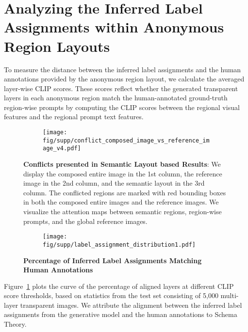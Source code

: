 \vspace{1mm}
\section{Analyzing the Inferred Label Assignments within Anonymous Region Layouts}
To measure the distance between the inferred label assignments and the human annotations provided by the anonymous region layout, we calculate the averaged layer-wise CLIP scores. These scores reflect whether the generated transparent layers in each anonymous region match the human-annotated ground-truth region-wise prompts by computing the CLIP scores between the regional visual features and the regional prompt text features.

\begin{figure}[!t]
\begin{minipage}[!t]{1\linewidth}
\begin{subfigure}[b]{1\textwidth}
\centering
\texttt{[image: fig/supp/conflict\_composed\_image\_vs\_reference\_image\_v4.pdf]}
\vspace{-3mm}
\end{subfigure}
\vspace{-5mm}
\caption{\footnotesize{
\textbf{Conflicts presented in Semantic Layout based Results}:
We display the composed entire image in the 1st column, the reference image in the 2nd column, and the semantic layout in the 3rd column. The conflicted regions are marked with red bounding boxes in both the composed entire images and the reference images. We visualize the attention maps between semantic regions, region-wise prompts, and the global reference images.
}}
\label{fig:conflict_case}
\end{minipage}
\vspace{3mm}
\begin{minipage}[!t]{1\linewidth}
\begin{subfigure}[b]{1\textwidth}
\centering
\texttt{[image: fig/supp/label\_assignment\_distribution1.pdf]}
\vspace{-3mm}
\end{subfigure}
\caption{\footnotesize{
\textbf{Percentage of Inferred Label Assignments Matching Human Annotations}
}}
\label{fig:percentage_threshold}
\end{minipage}
\end{figure}

Figure~\ref{fig:percentage_threshold} plots the curve of the percentage of aligned layers at different CLIP score thresholds, based on statistics from the test set consisting of 5,000 multi-layer transparent images. We attribute the alignment between the inferred label assignments from the generative model and the human annotations to Schema Theory.

